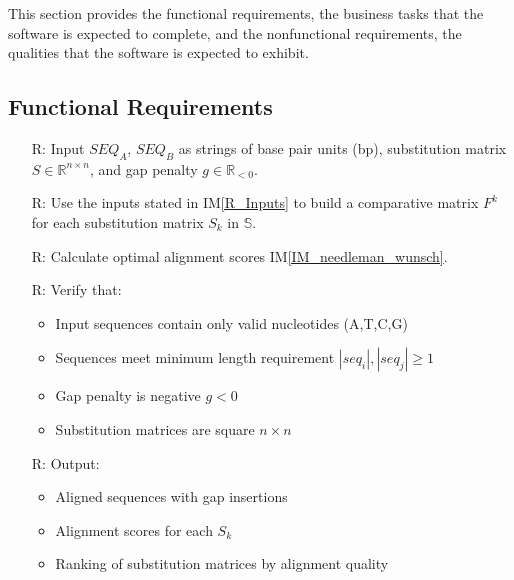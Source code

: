 \documentclass[12pt]{article}
\newcommand{\iref}[1]{IM\ref{#1}}
\newcounter{reqnum} %
\begin{document}

This section provides the functional requirements, the business tasks that the
software is expected to complete, and the nonfunctional requirements, the
qualities that the software is expected to exhibit.

\subsection{Functional Requirements}

\noindent \begin{itemize}

\item[R\refstepcounter{reqnum}\thereqnum \label{R_Inputs}:] Input $SEQ_A$, $SEQ_B$ as 
strings of base pair units (bp), substitution matrix $S \in \mathbb{R}^{n \times n}$, and gap penalty $g \in \mathbb{R}_{<0}$.


\item[R\refstepcounter{reqnum}\thereqnum \label{R_OutputInputs}:] Use the inputs 
stated in \iref{R_Inputs} to build a comparative matrix $F^k$ for 
each substitution matrix $S_k$ in $\mathbb{S}$.


\item[R\refstepcounter{reqnum}\thereqnum \label{R_Calculate}:] Calculate optimal 
alignment scores \iref{IM_needleman_wunsch}.

\item[R\refstepcounter{reqnum}\thereqnum \label{R_VerifyOutput}:] Verify that:
\begin{itemize}
\item Input sequences contain only valid nucleotides (A,T,C,G)
\item Sequences meet minimum length requirement $|seq_i|, |seq_j| \geq 1$
\item Gap penalty is negative $g < 0$
\item Substitution matrices are square $n \times n$
\end{itemize}

\item[R\refstepcounter{reqnum}\thereqnum \label{R_Output}:] Output:
\begin{itemize}
\item Aligned sequences with gap insertions
\item Alignment scores for each $S_k$
\item Ranking of substitution matrices by alignment quality
\end{itemize}

\end{itemize}
\end{document}
